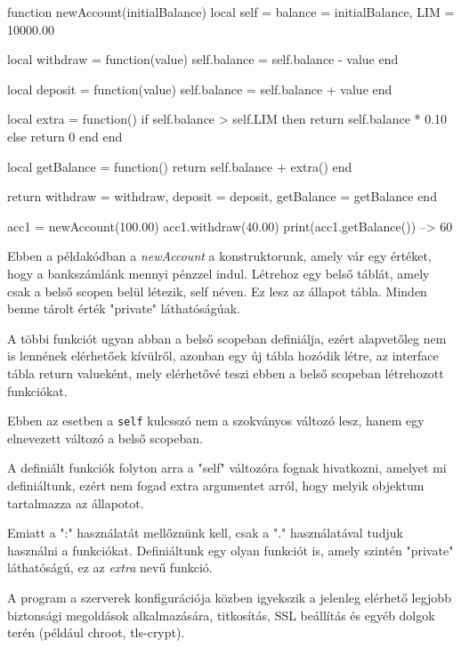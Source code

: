 \begin{lua}
function newAccount(initialBalance)
	local self = {balance = initialBalance, LIM = 10000.00}

	local withdraw = function(value)
		self.balance = self.balance - value
	end

	local deposit = function(value)
		self.balance = self.balance + value
	end
	
	local extra = function()
		if self.balance > self.LIM then
			return self.balance * 0.10
		else
			return 0
		end
	end

	local getBalance = function() return self.balance + extra() end

	return {
		withdraw = withdraw,
		deposit = deposit,
		getBalance = getBalance
	}
end

acc1 = newAccount(100.00)
acc1.withdraw(40.00)
print(acc1.getBalance())     --> 60
\end{lua}
Ebben a példakódban a \textit{newAccount} a konstruktorunk, amely vár egy értéket, hogy a bankszámlánk mennyi pénzzel indul. Létrehoz egy belső táblát, amely csak a belső scopen belül létezik, self néven. Ez lesz az állapot tábla. Minden benne tárolt érték "private" láthatóságúak. 

A többi funkciót ugyan abban a belső scopeban definiálja, ezért alapvetőleg nem is lennének elérhetőek kívülről, azonban egy új tábla hozódik létre, az interface tábla return valueként, mely elérhetővé teszi ebben a belső scopeban létrehozott funkciókat.

Ebben az esetben a \texttt{self} kulcsszó nem a szokványos változó lesz, hanem egy elnevezett változó a belső scopeban. 

\pagebreak

A definiált funkciók folyton arra a "self" változóra fognak hivatkozni, amelyet mi definiáltunk, ezért nem fogad extra argumentet arról, hogy melyik objektum tartalmazza az állapotot.

Emiatt a ":" használatát mellőznünk kell, csak a "." használatával tudjuk használni a funkciókat. Definiáltunk egy olyan funkciót is, amely szintén "private" láthatóságú, ez az \textit{extra} nevű funkció. \cite {classes}

\label{sect:how_it_should_work}

A program a szerverek konfigurációja közben igyekszik a jelenleg elérhető legjobb biztonsági megoldások alkalmazására, titkosítás, SSL beállítás és egyéb dolgok terén (például chroot, tls-crypt).


